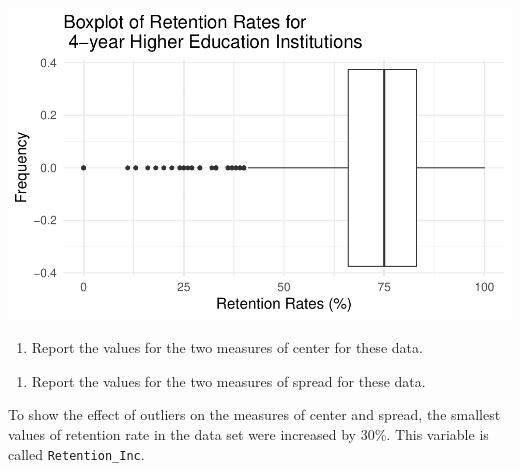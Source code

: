\documentclass[
]{report}
\providecommand{\tightlist}{%
  \setlength{\itemsep}{0pt}\setlength{\parskip}{0pt}}
\begin{document}
\begin{center}\includegraphics[width=0.7\linewidth]{06-A11-EDA-quantitative_files/figure-latex/unnamed-chunk-4-1} \end{center}

\begin{enumerate}
\def\labelenumi{\arabic{enumi}.}
\setcounter{enumi}{10}
\tightlist
\item
  Report the values for the two measures of center for these data.
\end{enumerate}

\vspace{0.5in}

\begin{enumerate}
\def\labelenumi{\arabic{enumi}.}
\setcounter{enumi}{11}
\tightlist
\item
  Report the values for the two measures of spread for these data.
\end{enumerate}

\vspace{0.5in}

To show the effect of outliers on the measures of center and spread, the smallest values of retention rate in the
data set were increased by 30\%. This variable is called \texttt{Retention\_Inc}.
\end{document}
